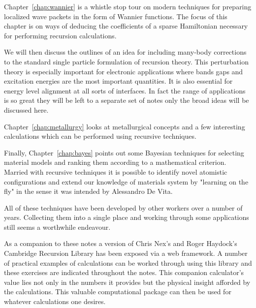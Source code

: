 Chapter~\ref{chap:wannier} is a whistle stop tour 
on modern techniques for preparing localized wave packets in the 
form of Wannier functions. The focus of this chapter is on 
ways of deducing the coefficients of a sparse Hamiltonian
necessary for performing recursion calculations.

We will then discuss the outlines of an idea for 
including many-body corrections to the standard 
single particle formulation of recursion theory. 
This perturbation theory is especially important for electronic 
applications where bands gaps and excitation energies 
are the most important quantities. It is also essential for
energy level alignment at all sorts of interfaces. In fact the range
of applications is so great they will be left to a separate set of notes
only the broad ideas will be discussed here.


Chapter~\ref{chap:metallurgy} looks at metallurgical concepts 
and a few interesting calculations which can be performed 
using recursive techniques. 

Finally, Chapter~\ref{chap:bayes} points out some Bayesian techniques 
for selecting material models and ranking them according 
to a mathematical criterion. Married with recursive techniques
it is possible to identify novel atomistic configurations
and extend our knowledge of materials system by "learning on the fly" 
in the sense it was intended by Alessandro De Vita.

All of these techniques have been developed by other workers 
over a number of years. Collecting them into a single place 
and working through some applications still seems a worthwhile 
endeavour. 

As a companion to these notes a version of Chris Nex's and Roger Haydock's Cambridge Recursion Library
has been exposed via a web framework. A number of practical examples of calculations can
be worked through using this library and these exercises are indicated throughout the notes. 
This companion calculator's value lies not only
in the numbers it provides but the physical insight afforded by the calculations.
This valuable computational package can then be used for whatever calculations one desires.

